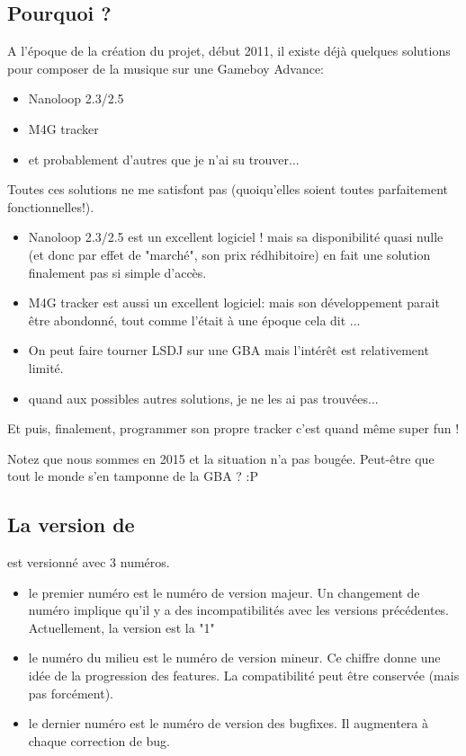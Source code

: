 \documentclass[12pt,a4paper]{article}
\begin{document}
    \subsection{Pourquoi \FAT ?}
    A l'époque de la création du projet, début 2011, il existe déjà quelques solutions pour composer de la musique sur une Gameboy Advance:
    \medskip
    
    \begin{itemize}
        \item{Nanoloop 2.3/2.5}
        \item{M4G tracker}
        \item{et probablement d'autres que je n'ai su trouver...}
    \end{itemize}\medskip
    
    Toutes ces solutions ne me satisfont pas (quoiqu'elles soient toutes parfaitement fonctionnelles!).
    \medskip
    
    \begin{itemize}
        \item{Nanoloop 2.3/2.5 est un excellent logiciel ! mais sa disponibilité quasi nulle (et donc par effet de "marché", son prix rédhibitoire) en fait une solution finalement pas si simple d'accès.}
        \item{M4G tracker est aussi un excellent logiciel: mais son développement parait être abondonné, tout comme l'était \FAT à une époque cela dit ...}
        \item{On peut faire tourner LSDJ sur une GBA mais l'intérêt est relativement limité.}
        \item{quand aux possibles autres solutions, je ne les ai pas trouvées...}
    \end{itemize}\medskip
    
    Et puis, finalement, programmer son propre tracker c'est quand même super fun !
    \medskip

    Notez que nous sommes en 2015 et la situation n'a pas bougée. Peut-être que tout le monde s'en tamponne de la GBA ? :P \medskip

    \subsection{La version de \FAT}

    \FAT est versionné avec 3 numéros.
    \begin{itemize}
        \item{le premier numéro est le numéro de version majeur. Un changement de numéro implique qu'il y a des incompatibilités avec les versions précédentes.
                    Actuellement, la version est la "1"}
        \item{le numéro du milieu est le numéro de version mineur.
                    Ce chiffre donne une idée de la progression des features. La compatibilité peut être conservée (mais pas forcément).}
        \item{le dernier numéro est le numéro de version des bugfixes. Il augmentera à chaque correction de bug.}
    \end{itemize}
    \medskip
\end{document}
